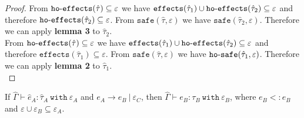 \documentclass{llncs}
\newcommand{\keywadj}[1]{\mathtt{#1}}
\newcommand{\keyw}[1]{\keywadj{#1}~}
\newcommand{\kw}[1]{\keyw{ #1 }}
\newcommand{\kwa}[1]{\keywadj{ #1 }}
\newcommand{\hyphen}{\hbox{-}}
\newcommand{\fx}[1]{ \kwa{effects}(#1) }
\newcommand{\hofx}[1]{ \kwa{ho \hyphen effects}(#1) }
\newcommand{\safe}[2]{ \kwa{safe}(#1, #2) }
\newcommand{\hosafe}[2]{ \kwa{ho \hyphen safe}(#1, #2) }
\begin{document}
\begin{proof}
\noindent
From $\hofx{\hat \tau} \subseteq \varepsilon$ we have $\fx{\hat \tau_1} \cup \hofx{\hat \tau_2} \subseteq \varepsilon$ and therefore $\hofx{\hat \tau_2} \subseteq \varepsilon$. From $\safe{\hat \tau}{\varepsilon}$ we have $\safe{\hat \tau_2}{\varepsilon}$. Therefore we can apply \textbf{lemma 3} to $\hat \tau_2$. \\

\noindent
From $\hofx{\hat \tau} \subseteq \varepsilon$ we have $\fx{\hat \tau_1} \cup \hofx{\hat \tau_2} \subseteq \varepsilon$ and therefore $\fx{\hat \tau_1} \subseteq \varepsilon$. From $\safe{\hat \tau}{\varepsilon}$ we have $\hosafe{\hat \tau_1}{\varepsilon}$. Therefore we can apply \textbf{lemma 2} to $\hat \tau_1$.
\\

\end{proof}



\hrulefill

\begin{theorem}[Preservation]
If $\hat \Gamma \vdash \hat e_A: \hat \tau_A~\kw{with} \varepsilon_A$ and $e_A \longrightarrow e_B~|~\varepsilon_C$, then $\hat \Gamma \vdash e_B: \tau_B~\kw{with} \varepsilon_B$, where $e_B <: e_B$ and $\varepsilon \cup \varepsilon_B \subseteq \varepsilon_A$.
\end{theorem}
\end{document}
